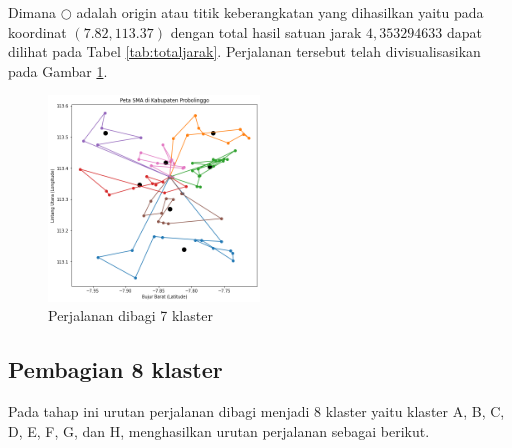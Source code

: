 Dimana $\bigcirc$ adalah origin atau titik keberangkatan yang dihasilkan yaitu pada koordinat $(7.82, 113.37)$ dengan total hasil satuan jarak $4,353294633$ dapat dilihat pada Tabel \ref{tab:totaljarak}. Perjalanan tersebut telah divisualisasikan pada Gambar \ref{fig:hasil_mtsp7}.

\begin{figure}[H]
\centering
\includegraphics[width=0.5\textwidth]{Gambar/hasil_mtsp/7}
\caption{Perjalanan dibagi 7 klaster}
\label{fig:hasil_mtsp7}
\end{figure}

\subsection{Pembagian 8 klaster}

Pada tahap ini urutan perjalanan dibagi menjadi 8 klaster yaitu klaster A, B, C, D, E, F, G, dan H, menghasilkan urutan perjalanan sebagai berikut.

